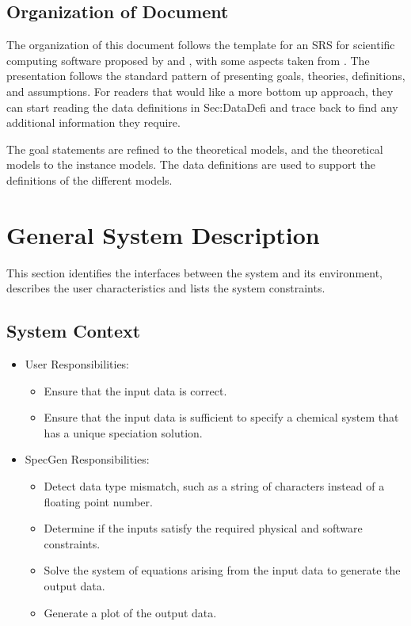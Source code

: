 \documentclass[12pt]{article}
\newcommand{\progname}{SpecGen} %
\begin{document}
\subsection{Organization of Document}
The organization of this document follows the template for an SRS for scientific 
computing software proposed by \cite{SmithAndLai2005} and \cite{Koothoor2013}, 
with some aspects taken from \cite{RobertsonAndRobertson1999Vol}. The 
presentation follows the standard pattern of presenting goals, theories, 
definitions, and assumptions. For readers that would like a more bottom up 
approach, they can start reading the data definitions in Sec:DataDefi and trace 
back to find any additional information they require.

The goal statements are refined to the theoretical models, and the theoretical 
models to the instance models. The data definitions are used to support the 
definitions of the different models.

\section{General System Description}
This section identifies the interfaces between the system and its environment,
describes the user characteristics and lists the system constraints.

\subsection{System Context}

\begin{itemize}
\item User Responsibilities:
\begin{itemize}
\item Ensure that the input data is correct.
\item Ensure that the input data is sufficient to specify a chemical system 
that has a unique speciation solution.
\end{itemize}
\item \progname{} Responsibilities:
\begin{itemize}
\item Detect data type mismatch, such as a string of characters instead of a
  floating point number.
\item Determine if the inputs satisfy the required physical and software 
  constraints.
\item Solve the system of equations arising from the input data to generate 
  the output data.
\item Generate a plot of the output data.
\end{itemize}
\end{itemize}
\end{document}
